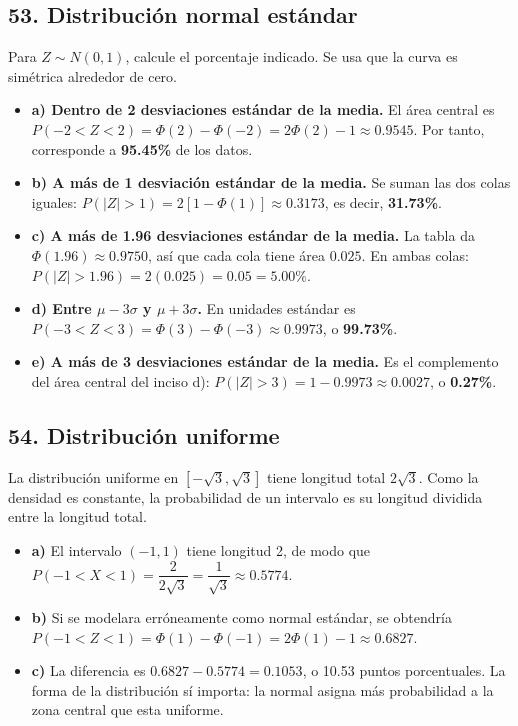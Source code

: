 \documentclass[11pt]{article}
\begin{document}
\subsection*{53. Distribución normal estándar}
Para $Z\sim N(0,1)$, calcule el porcentaje indicado. Se usa que la curva es simétrica alrededor de cero.
\begin{itemize}
  \item \textbf{a) Dentro de 2 desviaciones estándar de la media.} El área central es $P(-2<Z<2)=\Phi(2)-\Phi(-2)=2\Phi(2)-1\approx0.9545$. Por tanto, corresponde a \textbf{95.45\%} de los datos.
  \item \textbf{b) A más de 1 desviación estándar de la media.} Se suman las dos colas iguales: $P(|Z|>1)=2[1-\Phi(1)]\approx0.3173$, es decir, \textbf{31.73\%}.
  \item \textbf{c) A más de 1.96 desviaciones estándar de la media.} La tabla da $\Phi(1.96)\approx0.9750$, así que cada cola tiene área $0.025$. En ambas colas: $P(|Z|>1.96)=2(0.025)=0.05=\mathbf{5.00\%}$.
  \item \textbf{d) Entre $\mu-3\sigma$ y $\mu+3\sigma$.} En unidades estándar es $P(-3<Z<3)=\Phi(3)-\Phi(-3)\approx0.9973$, o \textbf{99.73\%}.
  \item \textbf{e) A más de 3 desviaciones estándar de la media.} Es el complemento del área central del inciso d): $P(|Z|>3)=1-0.9973\approx0.0027$, o \textbf{0.27\%}.
\end{itemize}

\subsection*{54. Distribución uniforme}
La distribución uniforme en $[-\sqrt{3},\sqrt{3}]$ tiene longitud total $2\sqrt{3}$. Como la densidad es constante, la probabilidad de un intervalo es su longitud dividida entre la longitud total.
\begin{itemize}
  \item \textbf{a)} El intervalo $(-1,1)$ tiene longitud 2, de modo que $P(-1<X<1)=\dfrac{2}{2\sqrt{3}}=\dfrac{1}{\sqrt{3}}\approx\mathbf{0.5774}$.
  \item \textbf{b)} Si se modelara erróneamente como normal estándar, se obtendría $P(-1<Z<1)=\Phi(1)-\Phi(-1)=2\Phi(1)-1\approx\mathbf{0.6827}$.
  \item \textbf{c)} La diferencia es $0.6827-0.5774=\mathbf{0.1053}$, o 10.53 puntos porcentuales. La forma de la distribución sí importa: la normal asigna más probabilidad a la zona central que esta uniforme.
\end{itemize}
\end{document}

